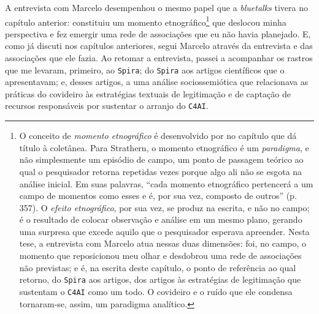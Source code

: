 A entrevista com Marcelo desempenhou o mesmo papel que a \textit{bluetalks} tivera no capítulo anterior: constituiu um momento etnográfico\footnote{O conceito de \textit{momento etnográfico} é desenvolvido por \textcite{strathern2014efeito} no capítulo que dá título à coletânea. Para Strathern, o momento etnográfico é um \textit{paradigma}, e não simplesmente um episódio de campo, um ponto de passagem teórico ao qual o pesquisador retorna repetidas vezes porque algo ali não se esgota na análise inicial. Em suas palavras, \enquote{cada momento etnográfico pertencerá a um campo de momentos como esses e é, por sua vez, composto de outros} (p. 357). O \textit{efeito etnográfico}, por sua vez, se produz na escrita, e não no campo; é o resultado de colocar observação e análise em um mesmo plano, gerando uma surpresa que excede aquilo que o pesquisador esperava apreender. Nesta tese, a entrevista com Marcelo atua nessas duas dimensões: foi, no campo, o momento que reposicionou meu olhar e desdobrou uma rede de associações não previstas; e é, na escrita deste capítulo, o ponto de referência ao qual retorno, do \texttt{Spira} aos artigos, dos artigos às estratégias de legitimação que sustentam o \texttt{C4AI} como um todo. O covideiro e o ruído que ele condensa tornaram-se, assim, um paradigma analítico.} que deslocou minha perspectiva e fez emergir uma rede de associações que eu não havia planejado. E, como já discuti nos capítulos anteriores, segui Marcelo através da entrevista e das associações que ele fazia. Ao retomar a entrevista, passei a acompanhar os rastros que me levaram, primeiro, ao \texttt{Spira}; do \texttt{Spira} aos artigos científicos que o apresentavam; e, desses artigos, a uma análise sociossemiótica que relacionava as práticas do covideiro às estratégias textuais de legitimação e de captação de recursos responsáveis por sustentar o arranjo do \texttt{C4AI}.
